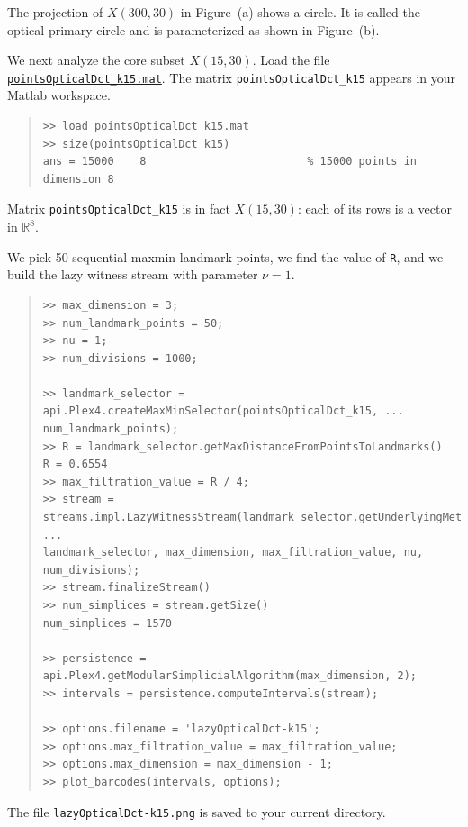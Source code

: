 \documentclass[amscd, amssymb, verbatim]{amsart}[12pt]
\theoremstyle{remark}
\theoremstyle{remark}
\theoremstyle{remark}
\newcommand{\R}{\mathbb{R}}
\begin{document}
The projection of $X(300,30)$ in Figure~(a) shows a circle. It is called the optical primary circle and is parameterized as shown in Figure~(b).

We next analyze the core subset $X(15,30)$. Load the file \href{https://github.com/appliedtopology/javaplex/tree/master/src/matlab/for_distribution/tutorial_examples/pointsOpticalDct_k15.mat}{\texttt{pointsOpticalDct\_k15.mat}}. The matrix \texttt{pointsOpticalDct\_k15} appears in your Matlab workspace.

\begin{quote} \begin{verbatim}
>> load pointsOpticalDct_k15.mat
>> size(pointsOpticalDct_k15) 
ans = 15000    8                         % 15000 points in dimension 8
\end{verbatim} \end{quote}

Matrix \texttt{pointsOpticalDct\_k15} is in fact $X(15,30)$: each of its rows is a vector in $\R^8$.

We pick 50 sequential maxmin landmark points, we find the value of \texttt{R}, and we build the lazy witness stream with parameter $\nu = 1$. 

\begin{quote} \begin{verbatim}
>> max_dimension = 3;
>> num_landmark_points = 50;
>> nu = 1;
>> num_divisions = 1000;

>> landmark_selector = api.Plex4.createMaxMinSelector(pointsOpticalDct_k15, ...
num_landmark_points);
>> R = landmark_selector.getMaxDistanceFromPointsToLandmarks() 
R = 0.6554                         
>> max_filtration_value = R / 4;
>> stream = streams.impl.LazyWitnessStream(landmark_selector.getUnderlyingMetricSpace(), ...
landmark_selector, max_dimension, max_filtration_value, nu, num_divisions);
>> stream.finalizeStream()
>> num_simplices = stream.getSize()
num_simplices = 1570                         

>> persistence = api.Plex4.getModularSimplicialAlgorithm(max_dimension, 2);
>> intervals = persistence.computeIntervals(stream);

>> options.filename = 'lazyOpticalDct-k15';
>> options.max_filtration_value = max_filtration_value;
>> options.max_dimension = max_dimension - 1;
>> plot_barcodes(intervals, options);
\end{verbatim} \end{quote}

The file \texttt{lazyOpticalDct-k15.png} is saved to your current directory.
\end{document}
